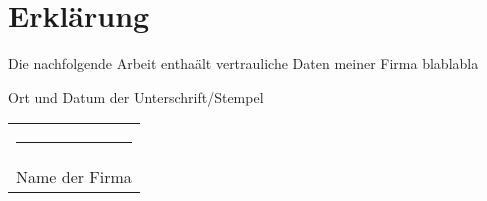 
\thispagestyle{empty}

\section*{Erklärung}
\vspace*{2em}

Die nachfolgende Arbeit enthaält vertrauliche Daten meiner Firma blablabla

\vspace{3em}

{\color{red}Ort und Datum der Unterschrift/Stempel}
\vspace{4em}

\begin{tabular}{p{}}
    \rule{7cm}{0.4pt}\\
    Name der Firma
\end{tabular}


